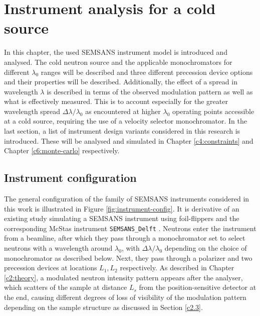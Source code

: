 \documentclass{article}
\begin{document}
\section{Instrument analysis for a cold source}
\label{c3}
In this chapter, the used SEMSANS instrument model is introduced and analysed. The cold neutron source and the applicable monochromators for different $\lambda_0$ ranges will be described and three different precession device options and their properties will be described. Additionally, the effect of a spread in wavelength $\lambda$ is described in terms of the observed modulation pattern as well as what is effectively measured. This is to account especially for the greater wavelength spread $\Delta\lambda/\lambda_0$ as encountered at higher $\lambda_0$ operating points accessible at a cold source, requiring the use of a velocity selector monochromator. In the last section, a list of instrument design variants considered in this research is introduced. These will be analysed and simulated in Chapter \ref{c4:constraints} and Chapter \ref{c6:monte-carlo} respectively. 

\subsection{Instrument configuration}
\label{c3.1}
The general configuration of the family of SEMSANS instruments considered in this work is illustrated in Figure \ref{fig:instrument-config}. It is derivative of an existing study simulating a SEMSANS instrument using foil-flippers and the corresponding McStas instrument \texttt{SEMSANS\_Delft} \cite{bouwman2021b}. Neutrons enter the instrument from a beamline, after which they pass through a monochromator set to select neutrons with a wavelength around $\lambda_0$, with  $\Delta\lambda/\lambda_0$ depending on the choice of monochromator as described below. Next, they pass through a polarizer and two precession devices at locations $L_1, L_2$ respectively. As described in Chapter \ref{c2:theory}, a modulated neutron intensity pattern appears after the analyser, which scatters of the sample at distance $L_s$ from the position-sensitive detector at the end, causing different degrees of loss of visibility of the modulation pattern depending on the sample structure as discussed in Section \ref{c2.3}. 
\end{document}

